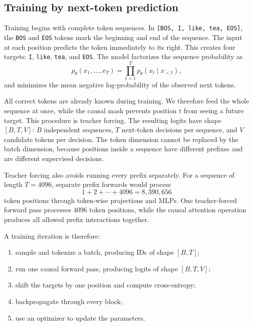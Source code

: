 \subsection{Training by next-token prediction}
\label{sec:transformer-training}

Training begins with complete token sequences. In
\texttt{[BOS, I, like, tea, EOS]}, the \texttt{BOS} and \texttt{EOS} tokens mark the
beginning and end of the sequence. The input at each position predicts the token
immediately to its right. This creates four
targets: \texttt{I}, \texttt{like}, \texttt{tea}, and \texttt{EOS}. The model factorizes
the sequence probability as
\begin{equation}
  p_\theta(x_1,\ldots,x_T)
  =\prod_{t=1}^{T}p_\theta(x_t\mid x_{<t}),
\end{equation}
and minimizes the mean negative log-probability of the observed next tokens.

All correct tokens are already known during training. We therefore feed the whole
sequence at once, while the causal mask prevents position $t$ from seeing a future
target. This procedure is teacher forcing. The resulting logits have shape $[B,T,V]$:
$B$ independent sequences, $T$ next-token decisions per sequence, and $V$ candidate
tokens per decision. The token dimension cannot be replaced by the batch dimension,
because positions inside a sequence have different prefixes and are different supervised
decisions.

Teacher forcing also avoids running every prefix separately. For a sequence of length
$T=4096$, separate prefix forwards would process
\begin{equation}
  1+2+\cdots+4096=8{,}390{,}656
\end{equation}
token positions through token-wise projections and MLPs. One teacher-forced forward pass
processes 4096 token positions, while the causal attention operation produces all allowed
prefix interactions together.

A training iteration is therefore:
\begin{enumerate}
  \item sample and tokenize a batch, producing IDs of shape $[B,T]$;
  \item run one causal forward pass, producing logits of shape $[B,T,V]$;
  \item shift the targets by one position and compute cross-entropy;
  \item backpropagate through every block;
  \item use an optimizer to update the parameters.
\end{enumerate}

